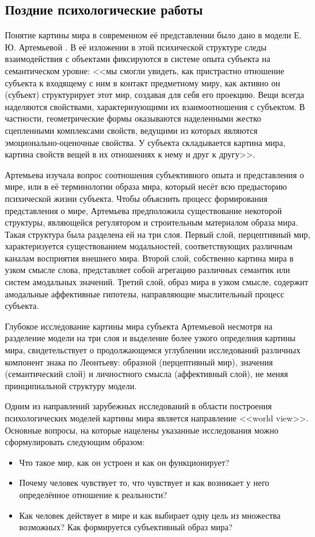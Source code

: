 \subsection{Поздние психологические работы} \label{subsect1_1_1}

Понятие картины мира в современном её представлении было дано в модели Е.\,Ю. Артемьевой \cite{Artemyeva1980}. В её изложении в этой психической структуре следы взаимодействия с объектами фиксируются в системе опыта субъекта на семантическом уровне: <<мы смогли увидеть, как пристрастно отношение субъекта к входящему с ним в контакт предметному миру, как активно он (субъект) структурирует этот мир, создавая для себя его проекцию. Вещи всегда наделяются свойствами, характеризующими их взаимоотношения с субъектом. В частности, геометрические формы оказываются наделенными жестко сцепленными комплексами свойств, ведущими из которых являются эмоционально-оценочные свойства. У субъекта складывается картина мира, картина свойств вещей в их отношениях к нему и друг к другу>>. 

Артемьева изучала вопрос соотношения субъективного опыта и представления о мире, или в её терминологии образа мира, который несёт всю предысторию психической жизни субъекта. Чтобы объяснить процесс формирования представления о мире, Артемьева предположила существование некоторой структуры, являющейся регулятором и строительным материалом образа мира. Такая структура была разделена ей на три слоя. Первый слой, перцептивный мир, характеризуется существованием модальностей, соответствующих различным каналам восприятия внешнего мира. Второй слой, собственно картина мира в узком смысле слова, представляет собой агрегацию различных семантик или систем амодальных значений. Третий слой, образ мира в узком смысле, содержит амодальные аффективные гипотезы, направляющие мыслительный процесс субъекта.

Глубокое исследование картины мира субъекта Артемьевой несмотря на разделение модели на три слоя и выделение более узкого определния картины мира, свидетельствует о продолжающемся углублении исследований различных компонент знака по Леонтьеву: образной (перцептивный мир), значения (семантический слой) и личностного смысла (аффективный слой), не меняя принципиальной структуру модели.

Одним из направлений зарубежных исследований в области построения психологических моделей картины мира является направление <<world view>>. Основные вопросы, на которые нацелены указанные исследования можно сформулировать следующим образом: 
\begin{itemize}
	\item Что такое мир, как он устроен и как он функционирует? 
	\item Почему человек чувствует то, что чувствует и как возникает у него определённое отношение к реальности? 
	\item Как человек действует в мире и как выбирает одну цель из множества возможных? Как формируется субъективный образ мира?
\end{itemize}
 
